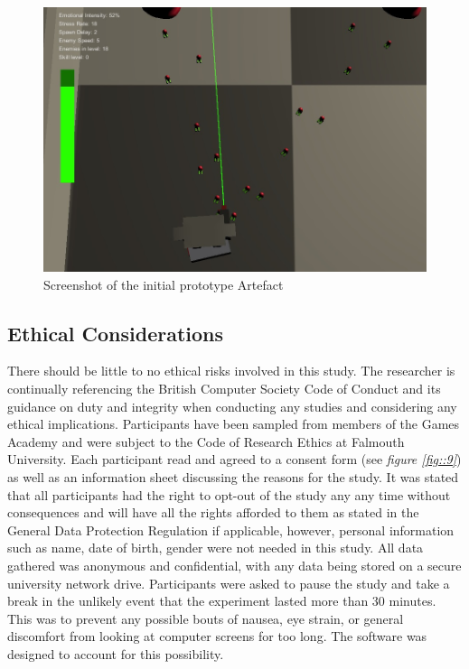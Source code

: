 \documentclass[journal]{IEEEtran}
\begin{document}
\begin{figure}[h]
	\includegraphics[width=1.0\linewidth]{artefactscreenshot.jpg}
	\caption{Screenshot of the initial prototype Artefact}
	\label{fig::2}
\end{figure} 

\subsection{Ethical Considerations}
There should be little to no ethical risks involved in this study. The researcher is continually referencing the British Computer Society Code of Conduct \cite{bcs} and its guidance on duty and integrity when conducting any studies and considering any ethical implications. Participants have been sampled from members of the Games Academy and were subject to the Code of Research Ethics at Falmouth University. Each participant read and agreed to a consent form (see \textit{figure \ref{fig::9}}) as well as an information sheet discussing the reasons for the study. It was stated that all participants had the right to opt-out of the study any any time without consequences and will have all the rights afforded to them as stated in the General Data Protection Regulation \cite{gdpr} if applicable, however, personal information such as name, date of birth, gender were not needed in this study. All data gathered was anonymous and confidential, with any data being stored on a secure university network drive. Participants were asked to pause the study and take a break in the unlikely event that the experiment lasted more than 30 minutes. This was to prevent any possible bouts of nausea, eye strain, or general discomfort from looking at computer screens for too long. The software was designed to account for this possibility.
\end{document}
